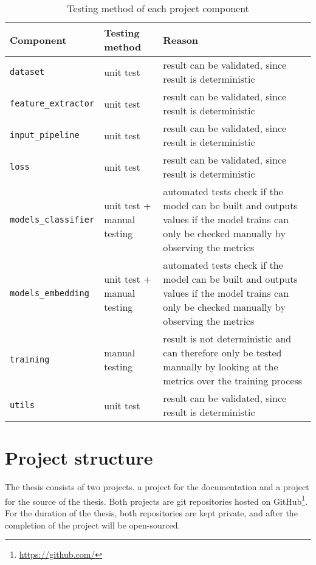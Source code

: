 \begin{table}[htbp]
    \centering
    \caption{Testing method of each project component}
	\label{tab:Components-Testing}
    \begin{tabular}{p{} | p{} | p{}}
        \toprule
        \textbf{Component} & \textbf{Testing method} & \textbf{Reason} \\ 
        \midrule[1pt]
        \texttt{dataset} & unit test & result can be validated, since result is deterministic \\
        \hline
        \texttt{feature\_extractor} & unit test & result can be validated, since result is deterministic \\
        \hline
        \texttt{input\_pipeline} & unit test & result can be validated, since result is deterministic \\
        \hline
        \texttt{loss}  & unit test & result can be validated, since result is deterministic \\
        \hline
        \texttt{models\_classifier} & unit test + manual testing & automated tests check if the model can be built and outputs values if the model trains can only be checked manually by observing the metrics \\
        \hline
        \texttt{models\_embedding} & unit test + manual testing & automated tests check if the model can be built and outputs values if the model trains can only be checked manually by observing the metrics \\
        \hline
        \texttt{training} & manual testing & result is not deterministic and can therefore only be tested manually by looking at the metrics over the training process \\
        \hline
        \texttt{utils} & unit test & result can be validated, since result is deterministic \\
        \bottomrule
    \end{tabular}
\end{table}

\section{Project structure}
\label{sec:Project-Structure}
The thesis consists of two projects, a project for the documentation and a project for the source of the thesis. Both projects are git repositories hosted on GitHub\footnote{\url{https://github.com/}}. For the duration of the thesis, both repositories are kept private, and after the completion of the project will be open-sourced.

